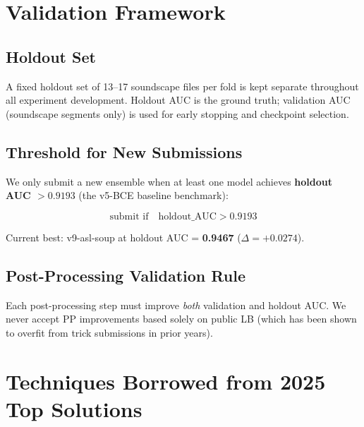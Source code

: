 \documentclass[11pt,a4paper]{article}
\begin{document}
\section{Validation Framework}
\label{sec:validation}

\subsection{Holdout Set}

A fixed holdout set of 13--17 soundscape files per fold is kept separate throughout
all experiment development. Holdout AUC is the ground truth; validation AUC
(soundscape segments only) is used for early stopping and checkpoint selection.

\subsection{Threshold for New Submissions}

We only submit a new ensemble when at least one model achieves
\textbf{holdout AUC $> 0.9193$} (the v5-BCE baseline benchmark):

\[
\text{submit if} \quad \text{holdout\_AUC} > 0.9193
\]

Current best: v9-asl-soup at holdout AUC = \textbf{0.9467} ($\Delta = +0.0274$).

\subsection{Post-Processing Validation Rule}

Each post-processing step must improve \emph{both} validation and holdout AUC.
We never accept PP improvements based solely on public LB (which has been shown
to overfit from trick submissions in prior years).

\section{Techniques Borrowed from 2025 Top Solutions}
\label{sec:2025}
\end{document}
